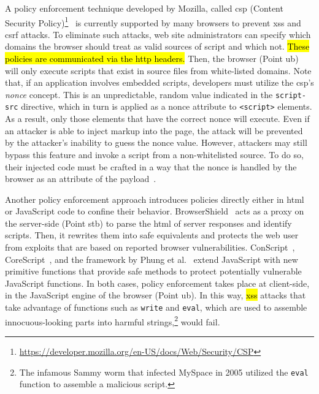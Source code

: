 \documentclass[10pt,journal,compsoc]{IEEEtran}
\newcommand{\hlc}[2][yellow]{ {\sethlcolor{#1} \hl{#2}} }
\begin{document}
\vspace{-1.5mm}
A policy enforcement technique developed by Mozilla,
called {\sc csp} (Content Security
Policy)\footnote{\scriptsize\url{https://developer.mozilla.org/en-US/docs/Web/Security/CSP}}~\cite{SSM10}
is currently supported by many browsers to prevent
{\sc xss} and {\sc csrf} attacks. To eliminate such
attacks, web site administrators
can specify which domains the browser should treat
as valid sources of script and which not.
\hlc[yellow]{These policies are communicated via the {\sc http} headers.}
Then, the browser
(Point {\sc ub}) will only execute scripts that exist in
source files from white-listed domains.
Note that,
if an application involves
embedded scripts, developers must utilize
the {\sc csp}'s {\em nonce} concept.
This is an unpredictable,
random value indicated in
the {\tt script-src} directive,
which in turn is applied as a nonce attribute to
{\tt <script>} elements.
As a result, only those elements that have the
correct nonce will execute.
Even if an attacker
is able to inject markup into the page,
the attack will be prevented by the attacker's
inability to guess the nonce value.
However, attackers may still bypass this feature
and invoke a script from a non-whitelisted source.
To do so, their injected code must
be crafted in a way that the nonce is handled
by the browser as an attribute of the payload~\cite{jigsaw}.

Another policy enforcement approach introduces
policies directly either in {\sc html} or JavaScript code
to confine their behavior. BrowserShield~\cite{RDWDE07}
acts as a proxy on the server-side (Point {\sc s}t{\sc b}) to
parse the {\sc html} of server responses and identify
scripts. Then, it rewrites them into safe equivalents
and protects the web user from exploits
that are based on reported browser vulnerabilities.
ConScript~\cite{ML10}, CoreScript~\cite{YCIS07},
and the framework by Phung et al.~\cite{PSC09}
extend JavaScript with new primitive functions that
provide safe methods to protect potentially vulnerable
JavaScript functions. In both cases, policy enforcement takes
place at client-side, in the JavaScript engine of the browser (Point {\sc ub}).
In this way, \hlc[yellow]{{\sc xss}} attacks that take advantage
of functions such as {\tt write} and {\tt eval}, which are
used to assemble innocuous-looking parts into harmful
strings,\footnote{\scriptsize The infamous Sammy worm that
infected MySpace in 2005
utilized the {\tt eval} function to assemble a
malicious script.} would fail.
\end{document}
